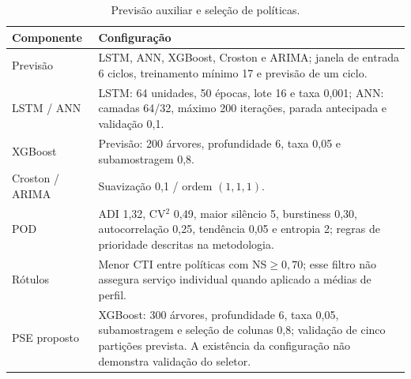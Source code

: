 \begin{table}[htbp]\centering\small
\caption{Previsão auxiliar e seleção de políticas.}\label{tab:forecast_label_params}
\begin{tabular}{@{}p{3cm}p{11.4cm}@{}}\toprule
\textbf{Componente} & \textbf{Configuração}\\\midrule
Previsão & LSTM, ANN, XGBoost, Croston e ARIMA; janela de entrada 6 ciclos, treinamento mínimo 17 e previsão de um ciclo.\\
LSTM / ANN & LSTM: 64 unidades, 50 épocas, lote 16 e taxa 0,001; ANN: camadas 64/32, máximo 200 iterações, parada antecipada e validação 0,1.\\
XGBoost & Previsão: 200 árvores, profundidade 6, taxa 0,05 e subamostragem 0,8.\\
Croston / ARIMA & Suavização 0,1 / ordem $(1,1,1)$.\\
POD & ADI 1,32, CV$^2$ 0,49, maior silêncio 5, burstiness 0,30, autocorrelação 0,25, tendência 0,05 e entropia 2; regras de prioridade descritas na metodologia.\\
Rótulos & Menor CTI entre políticas com NS$\geq0{,}70$; esse filtro não assegura serviço individual quando aplicado a médias de perfil.\\
PSE proposto & XGBoost: 300 árvores, profundidade 6, taxa 0,05, subamostragem e seleção de colunas 0,8; validação de cinco partições prevista. A existência da configuração não demonstra validação do seletor.\\
\bottomrule\end{tabular}\end{table}

